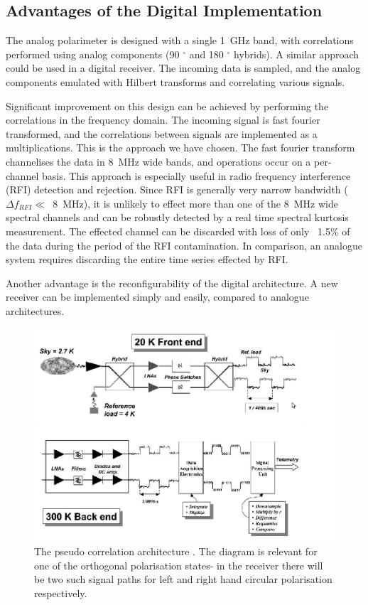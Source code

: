 \subsection{Advantages of the Digital Implementation}
The analog polarimeter is designed with a single 1~GHz band, with correlations performed using analog components (90  $^{\circ}$ and 180 $^{\circ}$ hybrids). A similar approach could be used in a digital receiver. The incoming data is sampled, and the analog components emulated with Hilbert transforms and correlating various signals.  


Significant improvement on this design can be achieved by performing the correlations in the frequency domain. The incoming signal is fast fourier transformed, and the correlations between signals are implemented as a multiplications. This is the approach we have chosen. The fast fourier transform channelises the data in 8~MHz wide bands, and operations occur on a per-channel basis. This approach is especially useful in radio frequency interference (RFI) detection and rejection. Since RFI is generally very narrow bandwidth ($\Delta f_{RFI}\ll$~8~MHz), it is unlikely to effect more than one of the 8~MHz wide spectral channels and can be robustly detected by a real time spectral kurtosis measurement. The effected channel can be discarded with loss of only ~1.5\% of the data during the period of the RFI contamination. In comparison, an analogue system requires discarding the entire time series effected by RFI.

Another advantage is the reconfigurability of the digital architecture. A new receiver can be implemented simply and easily, compared to analogue architectures. 


\begin{figure}
 \centering
 \includegraphics[width=\textwidth]{images/receiver_schematics/pseudo_correlation.png}
 \caption{The pseudo correlation architecture \protect \cite{Mennella2003b}. The diagram is relevant for one of the orthogonal polarisation states- in the receiver there will be two such signal paths for left and right hand circular polarisation respectively. } 
 \label{fig:pseudo_correlation}
\end{figure}


